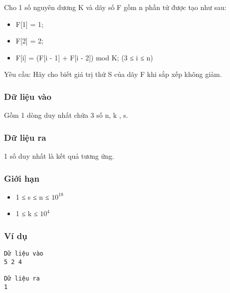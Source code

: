 



   Cho 1 số nguyên dương K và dãy số F gồm n phần tử được tạo như sau:  
\begin{itemize}
	\item     F[1] = 1;   
	\item     F[2] = 2;   
	\item     F[i] = (F[i - 1] + F[i - 2]) mod K; (3 ≤ i ≤ n)   
\end{itemize}

       Yêu cầu:      Hãy cho biết giá trị thứ S của dãy F khi sắp xếp không giảm.  

\subsubsection{   Dữ liệu vào  }

   Gồm 1 dòng duy nhất chứa 3 số n, k , s.  

\subsubsection{   Dữ liệu ra  }

   1 số duy nhất là kết quả tương ứng.  

\subsubsection{   Giới hạn  }
\begin{itemize}
	\item     1 ≤ s ≤ n ≤ $10^{18}$
	\item     1 ≤ k ≤ $10^{4}$
\end{itemize}

\subsubsection{   Ví dụ  }
\begin{verbatim}
Dữ liệu vào
5 2 4

Dữ liệu ra
1
\end{verbatim}

